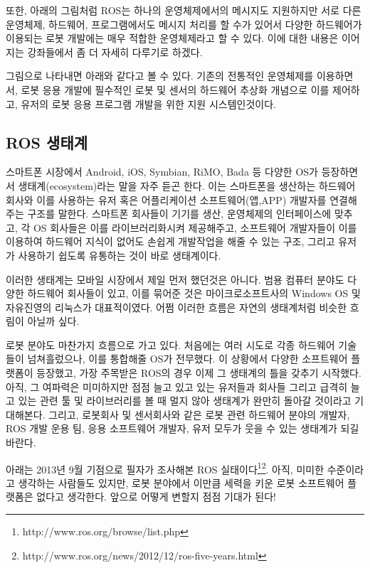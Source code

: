 또한, 아래의 그림처럼 ROS는 하나의 운영체제에서의 메시지도 지원하지만 서로 다른 운영체제, 하드웨어, 프로그램에서도 메시지 처리를 할 수가 있어서 다양한 하드웨어가 이용되는 로봇 개발에는 매우 적합한 운영체제라고 할 수 있다.
이에 대한 내용은 이어지는 강좌들에서 좀 더 자세히 다루기로 하겠다.  

그림으로 나타내면 아래와 같다고 볼 수 있다. 기존의 전통적인 운영체제를 이용하면서, 로봇 응용 개발에 필수적인 로봇 및 센서의 하드웨어 추상화 개념으로 이를 제어하고, 유저의 로봇 응용 프로그램 개발을 위한 지원 시스템인것이다.

\subsection{ROS 생태계}

스마트폰 시장에서 Android, iOS,  Symbian, RiMO, Bada 등 다양한 OS가 등장하면서 생태계(ecosystem)라는 말을 자주 듣곤 한다.
이는 스마트폰을 생산하는 하드웨어 회사와 이를 사용하는 유저 혹은 어플리케이션 소프트웨어(앱,APP) 개발자를 연결해주는 구조를 말한다.
스마트폰 회사들이 기기를 생산, 운영체제의 인터페이스에 맞추고, 각 OS 회사들은 이를 라이브러리화시켜 제공해주고, 소프트웨어 개발자들이 이를 이용하여 하드웨어 지식이 없어도 손쉽게 개발작업을 해줄 수 있는 구조, 그리고 유저가 사용하기 쉽도록 유통하는 것이 바로 생태계이다. 

이러한 생태계는 모바일 시장에서 제일 먼저 했던것은 아니다.
범용 컴퓨터 분야도 다양한 하드웨어 회사들이 있고, 이를 묶어준 것은 마이크로소프트사의 Windows OS 및 자유진영의 리눅스가 대표적이였다.
어쩜 이러한 흐름은 자연의 생태계처럼 비슷한 흐림이 아닐까 싶다. 

로봇 분야도 마찬가지 흐름으로 가고 있다.
처음에는 여러 시도로 각종 하드웨어 기술들이 넘쳐흘렀으나, 이를 통합해줄 OS가 전무했다.
이 상황에서 다양한 소프트웨어 플랫폼이 등장했고, 가장 주목받은 ROS의 경우 이제 그 생태계의 틀을 갖추기 시작했다.
아직, 그 여파력은 미미하지만 점점 늘고 있고 있는 유저들과 회사들 그리고 급격히 늘고 있는 관련 툴 및 라이브러리를 볼 때 멀지 않아 생태계가 완만히 돌아갈 것이라고 기대해본다.
그리고, 로봇회사 및 센서회사와 같은 로봇 관련 하드웨어 분야의 개발자, ROS 개발 운용 팀, 응용 소프트웨어 개발자, 유저 모두가 웃을 수 있는 생태계가 되길 바란다.
 
아래는 2013년 9월 기점으로 필자가 조사해본 ROS 실태이다\footnote{http://www.ros.org/browse/list.php}\footnote{http://www.ros.org/news/2012/12/ros-five-years.html}.
아직, 미미한 수준이라고 생각하는 사람들도 있지만, 로봇 분야에서 이만큼 세력을 키운 로봇 소프트웨어 플랫폼은 없다고 생각한다.
앞으로 어떻게 변할지 점점 기대가 된다!

